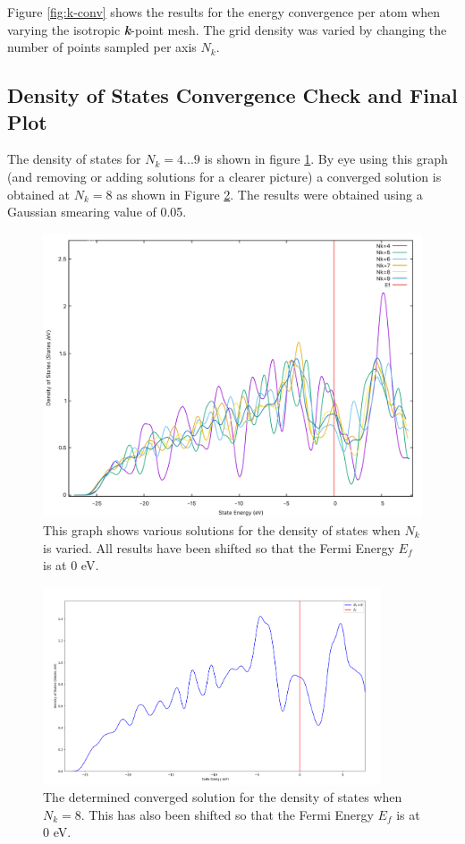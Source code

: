 \documentclass[a4paper,12pt]{article}
\begin{document}
\bigskip
\noindent Figure \ref{fig:k-conv} shows the results for the energy convergence per atom when varying the isotropic \textbf{\textit{k}}-point mesh. The grid density was varied by changing the number of points sampled per axis $N_k$.

\subsection{Density of States Convergence Check and Final Plot}
The density of states for $N_k=4...9$ is shown in figure \ref{fig:dos-conv}. By eye using this graph (and removing or adding solutions for a clearer picture) a converged solution is obtained at $N_k=8$ as shown in Figure \ref{fig:dos-final}. The results were obtained using a Gaussian smearing value of 0.05.

\begin{figure}[h!!!]
	\centering
	\includegraphics[width=12cm]{dos-conv.pdf}
	\caption{This graph shows various solutions for the density of states when $N_k$ is varied. All results have been shifted so that the Fermi Energy $E_f$ is at 0 eV.}
	\label{fig:dos-conv}
\end{figure}


\begin{figure}[h!!!]
	\centering
	\includegraphics[width=10cm]{dos-final.png}
	\caption{The determined converged solution for the density of states when $N_k=8$. This has also been shifted so that the Fermi Energy $E_f$ is at 0 eV.}
	\label{fig:dos-final}
\end{figure}
\end{document}
